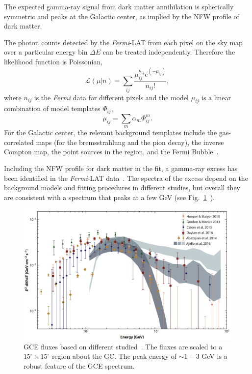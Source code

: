 \documentclass[doublespace,nopageskip]{VTthesis} %
\begin{document}
The expected gamma-ray signal from dark matter annihilation is spherically symmetric and peaks at the Galactic center, as implied by the NFW profile of dark matter.

The photon counts detected by the \textit{Fermi}-LAT from each pixel on the sky map over a particular energy bin $\Delta E$ can be treated independently. Therefore the likelihood function is Poissonian,
\begin{equation}
    \mathcal{L}(\mu|n)= \sum_{ij}\frac{\mu_{ij}^{n_{ij}}e^{(-\mu_{ij})}}{n_{ij}!},
\end{equation}
where $n_{ij}$ is the \textit{Fermi} data for different pixels and the model $\mu_{ij}$ is a linear combination of model templates $\Phi_{ij}$,
\begin{equation}
    \mu_{ij} = \sum_m \alpha_m \Phi^m_{ij}.
\end{equation}
For the Galactic center, the relevant background templates include the gas-correlated maps (for the bremsstrahlung and the pion decay), the inverse Compton map, the point sources in the region, and the Fermi Bubble~\cite{2010ApJ...724.1044S}.

Including the NFW profile for dark matter in the fit, a gamma-ray excess has been identified in the \textit{Fermi}-LAT data~\cite{2009arXiv0910.2998G, 2009arXiv0912.3828V,2011PhLB..697..412H,2012PhRvD..86h3511A,2013PhRvD..88h3521G,2014PhRvD..89f3515M,2013PDU.....2..118H,2014PhRvD..90b3526A,2016PDU....12....1D,2015JCAP...03..038C,2015PhRvD..91l3010Z,2016ApJ...819...44A,2017ApJ...840...43A}. The spectra of the excess depend on the background models and fitting procedures in different studies, but overall they are consistent with a spectrum that peaks at a few GeV (see Fig.~\ref{fig:gce_spectra}~\cite{Murgia:2020dzu}).
\begin{figure}[htb]
    \centering
    \includegraphics[width=\textwidth]{Figures/Intro/gcespectrum.png}
    \caption{GCE fluxes based on different studied~\cite{Murgia:2020dzu}. The fluxes are scaled to a $15^\circ \times 15^\circ$ region about the GC. The peak energy of $\sim 1 - 3$ GeV is a robust feature of the GCE spectrum.}
    \label{fig:gce_spectra}
\end{figure}
\end{document}
